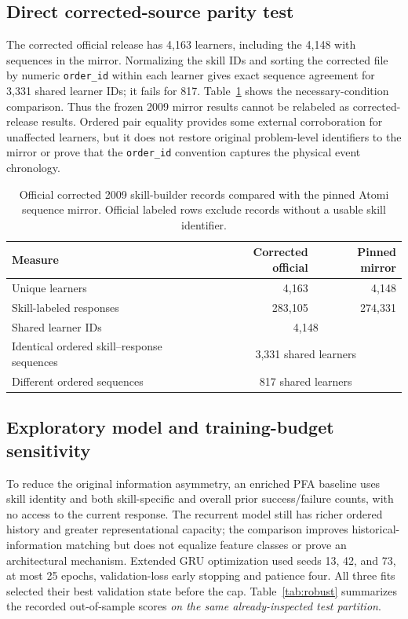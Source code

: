 \documentclass[11pt,a4paper]{article}
\begin{document}
\subsection{Direct corrected-source parity test}
The corrected official release has 4,163 learners, including the 4,148 with sequences in the mirror. Normalizing the skill IDs and sorting the corrected file by numeric \texttt{order\_id} within each learner gives exact sequence agreement for 3,331 shared learner IDs; it fails for 817. Table~\ref{tab:parity} shows the necessary-condition comparison. Thus the frozen 2009 mirror results cannot be relabeled as corrected-release results. Ordered pair equality provides some external corroboration for unaffected learners, but it does not restore original problem-level identifiers to the mirror or prove that the \texttt{order\_id} convention captures the physical event chronology.
\begin{table}[ht]\centering\small
\caption{Official corrected 2009 skill-builder records compared with the pinned Atomi sequence mirror. Official labeled rows exclude records without a usable skill identifier.}
\label{tab:parity}
\begin{tabular}{lrr}\toprule
Measure & Corrected official & Pinned mirror\\\midrule
Unique learners & 4,163 & 4,148\\
Skill-labeled responses & 283,105 & 274,331\\
Shared learner IDs & \multicolumn{2}{c}{4,148}\\
Identical ordered skill--response sequences & \multicolumn{2}{c}{3,331 shared learners}\\
Different ordered sequences & \multicolumn{2}{c}{817 shared learners}\\\bottomrule
\end{tabular}
\end{table}

\subsection{Exploratory model and training-budget sensitivity}
To reduce the original information asymmetry, an enriched PFA baseline uses skill identity and both skill-specific and overall prior success/failure counts, with no access to the current response. The recurrent model still has richer ordered history and greater representational capacity; the comparison improves historical-information matching but does not equalize feature classes or prove an architectural mechanism. Extended GRU optimization used seeds 13, 42, and 73, at most 25 epochs, validation-loss early stopping and patience four. All three fits selected their best validation state before the cap. Table~\ref{tab:robust} summarizes the recorded out-of-sample scores \emph{on the same already-inspected test partition}.
\end{document}
